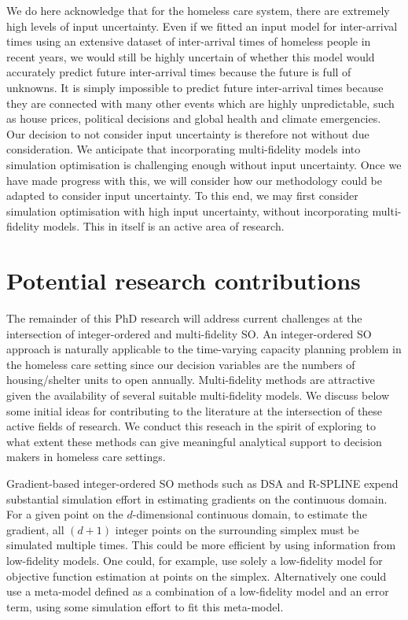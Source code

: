 \documentclass[12pt,a4paper]{article}
\begin{document}
We do here acknowledge that for the homeless care system, there are extremely high levels of input uncertainty. Even if we fitted an input model for inter-arrival times using an extensive dataset of inter-arrival times of homeless people in recent years, we would still be highly uncertain of whether this model would accurately predict future inter-arrival times because the future is full of unknowns. It is simply impossible to predict future inter-arrival times because they are connected with many other events which are highly unpredictable, such as house prices, political decisions and global health and climate emergencies. Our decision to not consider input uncertainty is therefore not without due consideration. We anticipate that incorporating multi-fidelity models into simulation optimisation is challenging enough without input uncertainty. Once we have made progress with this, we will consider how our methodology could be adapted to consider input uncertainty. To this end, we may first consider simulation optimisation with high input uncertainty, without incorporating multi-fidelity models. This in itself is an active area of research.

\newpage

\section{Potential research contributions} \label{mfso}

The remainder of this PhD research will address current challenges at the intersection of integer-ordered and multi-fidelity SO. An integer-ordered SO approach is naturally applicable to the time-varying capacity planning problem in the homeless care setting since our decision variables are the numbers of housing/shelter units to open annually. Multi-fidelity methods are attractive given the availability of several suitable multi-fidelity models. We discuss below some initial ideas for contributing to the literature at the intersection of these active fields of research. We conduct this reseach in the spirit of exploring to what extent these methods can give meaningful analytical support to decision makers in homeless care settings. 

Gradient-based integer-ordered SO methods such as DSA and R-SPLINE expend substantial simulation effort in estimating gradients on the continuous domain. For a given point on the $d$-dimensional continuous domain, to estimate the gradient, all $(d+1)$ integer points on the surrounding simplex must be simulated multiple times. This could be more efficient by using information from low-fidelity models. One could, for example, use solely a low-fidelity model for objective function estimation at points on the simplex. Alternatively one could use a meta-model defined as a combination of a low-fidelity model and an error term, using some simulation effort to fit this meta-model.
\end{document}
